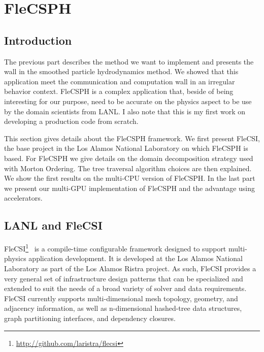 \chapter{FleCSPH}

\section{Introduction}

The previous part describes the method we want to implement and presents the wall in the smoothed particle hydrodynamics method. 
We showed that this application meet the communication and computation wall in an irregular behavior context. 
FleCSPH is a complex application that, beside of being interesting for our purpose, need to be accurate on the physics aspect to be use by the domain scientists from LANL. 
I also note that this is my first work on developing a production code from scratch.

This section gives details about the FleCSPH framework. 
We first present FleCSI, the base project in the Los Alamos National Laboratory on which FleCSPH is based. 
For FleCSPH we give details on the domain decomposition strategy used with Morton Ordering. 
The tree traversal algorithm choices are then explained. 
We show the first results on the multi-CPU version of FleCSPH. 
In the last part we present our multi-GPU implementation of FleCSPH and the advantage using accelerators. 

\section{LANL and FleCSI}

FleCSI\footnote{\url{http://github.com/laristra/flecsi}}~\cite{bergen2016flexible} is a compile-time configurable framework designed to support multi-physics application development. 
It is developed at the Los Alamos National Laboratory as part of the Los Alamos Ristra project. 
As such, FleCSI provides a very general set of infrastructure design patterns that can be specialized and extended to suit the needs of a broad variety of solver and data requirements. 
FleCSI currently supports multi-dimensional mesh topology, geometry, and adjacency information, as well as n-dimensional hashed-tree data structures, graph partitioning interfaces, and dependency closures.

